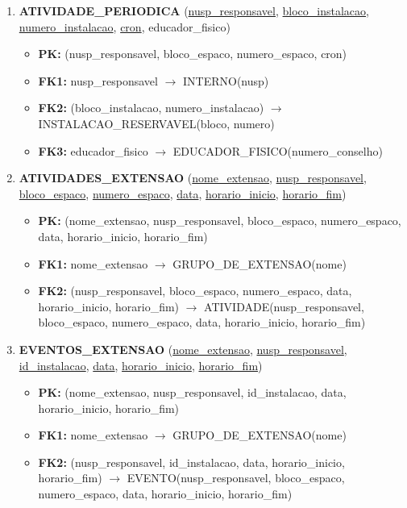 \documentclass{article}
\begin{document}
\begin{enumerate}
    \item \textbf{ATIVIDADE\_PERIODICA} (\underline{nusp\_responsavel}, \underline{bloco\_instalacao}, \underline{numero\_instalacao}, \underline{cron}, educador\_fisico)
        \begin{itemize}
            \item \textbf{PK:} (nusp\_responsavel, bloco\_espaco, numero\_espaco, cron)
            \item \textbf{FK1:} nusp\_responsavel $\rightarrow$ INTERNO(nusp)
            \item \textbf{FK2:} (bloco\_instalacao, numero\_instalacao) $\rightarrow$ INSTALACAO\_RESERVAVEL(bloco, numero)
            \item \textbf{FK3:} educador\_fisico $\rightarrow$ EDUCADOR\_FISICO(numero\_conselho)
        \end{itemize}

    \item \textbf{ATIVIDADES\_EXTENSAO} (\underline{nome\_extensao}, \underline{nusp\_responsavel}, \underline{bloco\_espaco}, \underline{numero\_espaco}, \underline{data}, \underline{horario\_inicio}, \underline{horario\_fim})
        \begin{itemize}
            \item \textbf{PK:} (nome\_extensao, nusp\_responsavel, bloco\_espaco, numero\_espaco, data, horario\_inicio, horario\_fim)
            \item \textbf{FK1:} nome\_extensao $\rightarrow$ GRUPO\_DE\_EXTENSAO(nome)
            \item \textbf{FK2:} (nusp\_responsavel, bloco\_espaco, numero\_espaco, data, horario\_inicio, horario\_fim) $\rightarrow$ ATIVIDADE(nusp\_responsavel, bloco\_espaco, numero\_espaco, data, horario\_inicio, horario\_fim)
        \end{itemize}

    \item \textbf{EVENTOS\_EXTENSAO} (\underline{nome\_extensao}, \underline{nusp\_responsavel}, \underline{id\_instalacao}, \underline{data}, \underline{horario\_inicio}, \underline{horario\_fim})
        \begin{itemize}
            \item \textbf{PK:} (nome\_extensao, nusp\_responsavel, id\_instalacao, data, horario\_inicio, horario\_fim)
            \item \textbf{FK1:} nome\_extensao $\rightarrow$ GRUPO\_DE\_EXTENSAO(nome)
            \item \textbf{FK2:} (nusp\_responsavel, id\_instalacao, data, horario\_inicio, horario\_fim) $\rightarrow$ EVENTO(nusp\_responsavel, bloco\_espaco, numero\_espaco, data, horario\_inicio, horario\_fim)
        \end{itemize}
        

\end{enumerate}
\end{document}
